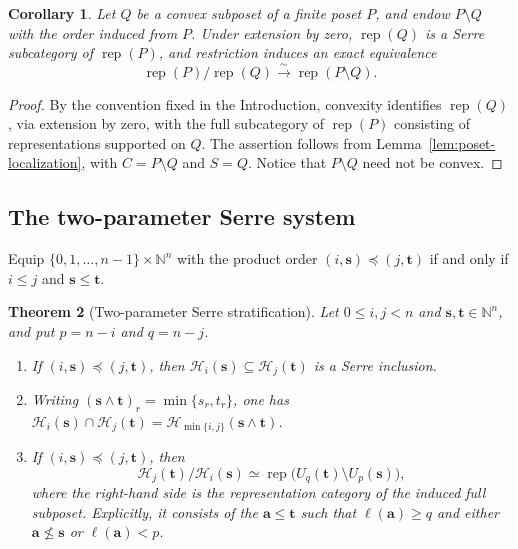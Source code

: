 \documentclass[12pt,reqno]{amsart}
\newtheorem{theorem}{Theorem}[section]
\newtheorem{corollary}[theorem]{Corollary}
\theoremstyle{definition}
\theoremstyle{remark}
\newcommand{\Rep}{\operatorname{rep}}
\begin{document}
\begin{corollary}
\label{cor:convex-poset-localization}
Let $Q$ be a convex subposet of a finite poset $P$, and endow
$P\setminus Q$ with the order induced from $P$.  Under extension by zero,
$\Rep(Q)$ is a Serre subcategory of $\Rep(P)$, and restriction induces an exact equivalence
\[
\Rep(P)/\Rep(Q)\xrightarrow{\sim}\Rep(P\setminus Q).
\]
\end{corollary}

\begin{proof}
By the convention fixed in the Introduction, convexity identifies $\Rep(Q)$,
via extension by zero, with the full subcategory of $\Rep(P)$ consisting of
representations supported on $Q$.  The assertion follows from
Lemma~\ref{lem:poset-localization}, with $C=P\setminus Q$ and $S=Q$.
Notice that $P\setminus Q$ need not be convex.
\end{proof}

\subsection{The two-parameter Serre system}

Equip $\{0,1,\ldots,n-1\}\times\mathbb N^n$ with the product order
$(i,\mathbf s)\preceq(j,\mathbf t)$ if and only if $i\le j$ and
$\mathbf s\le\mathbf t$.

\begin{theorem}[Two-parameter Serre stratification]\label{thm:two-parameter}
Let $0\le i,j<n$ and $\mathbf s,\mathbf t\in\mathbb N^n$, and put
$p=n-i$ and $q=n-j$.
\begin{enumerate}[label=\rm(\arabic*)]
\item If $(i,\mathbf s)\preceq(j,\mathbf t)$, then
$\mathcal H_i(\mathbf s)\subseteq\mathcal H_j(\mathbf t)$ is a Serre
inclusion.

\item Writing $(\mathbf s\wedge\mathbf t)_r=\min\{s_r,t_r\}$, one has
$\mathcal H_i(\mathbf s)\cap\mathcal H_j(\mathbf t)
=\mathcal H_{\min\{i,j\}}(\mathbf s\wedge\mathbf t)$.

\item If $(i,\mathbf s)\preceq(j,\mathbf t)$, then
\[
\mathcal H_j(\mathbf t)/\mathcal H_i(\mathbf s)
\simeq
\Rep\bigl(U_q(\mathbf t)\setminus U_p(\mathbf s)\bigr),
\]
where the right-hand side is the representation category of the induced full
subposet.  Explicitly, it consists of the $\mathbf a\le\mathbf t$ such that
$\ell(\mathbf a)\ge q$ and either $\mathbf a\nleq\mathbf s$ or
$\ell(\mathbf a)<p$.
\end{enumerate}
\end{theorem}
\end{document}

